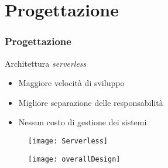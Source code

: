 
\section{Progettazione}
\begin{frame}

  \frametitle{Progettazione}

  Architettura \textit{serverless}
  \begin{itemize}
  \item Maggiore velocit\`a di sviluppo
  \item Migliore separazione delle responsabilit\`a
  \item Nessun costo di gestione dei sistemi
  \end{itemize}

  \begin{figure}[H]
    \centering
    \texttt{[image: Serverless]}
  \end{figure}
\end{frame}

\begin{frame}

  \begin{figure}[H]
    \centering
    \texttt{[image: overallDesign]}
  \end{figure}
\end{frame}

\begin{frame}


\end{frame}
